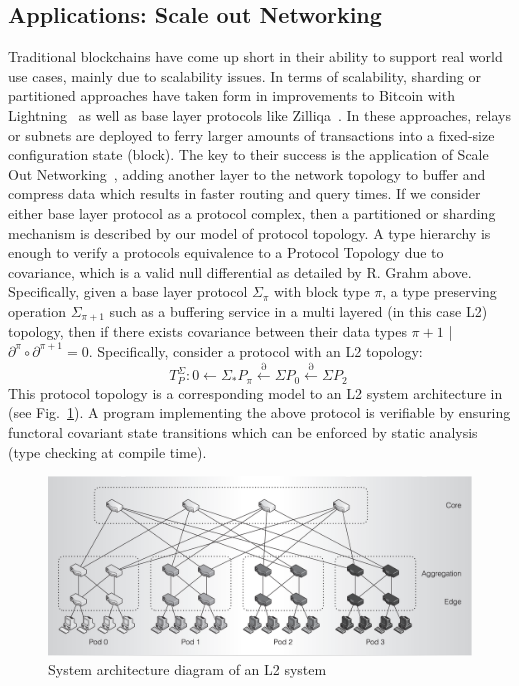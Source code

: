 \documentclass[runningheads]{llncs}
\begin{document}
\subsection{Applications: Scale out Networking}
Traditional blockchains have come up short in their ability to support real world use cases, mainly due to scalability issues. In terms of scalability, sharding or partitioned approaches have taken form in improvements to Bitcoin with Lightning~\cite{ref_url4} as well as base layer protocols like Zilliqa~\cite{ref_url5}. In these approaches, relays or subnets are deployed to ferry larger amounts of transactions into a fixed-size configuration state (block). The key to their success is the application of Scale Out Networking~\cite{ref_article11}, adding another layer to the network topology to buffer and compress data which results in faster routing and query times. If we consider either base layer protocol as a protocol complex, then a partitioned or sharding mechanism is described by our model of protocol topology. A type hierarchy is enough to verify a protocols equivalence to a Protocol Topology due to covariance, which is a valid null differential as detailed by R. Grahm above. Specifically, given a base layer protocol $\Sigma_\pi$ with block type $\pi$, a type preserving operation $\Sigma_{\pi+1}$ such as a buffering service in a multi layered (in this case L2) topology, then if there exists covariance between their data types $\pi+1$ | $\partial^\pi \circ \partial^{\pi+1} = 0$. Specifically, consider a protocol with an L2 topology:
\begin{equation}
T^{\Sigma}_P: 0 \leftarrow \Sigma_{*}P_\pi \xleftarrow{\partial} \Sigma P_{0} \xleftarrow{\partial} \Sigma P_2 \ 
\end{equation}
This protocol topology is a corresponding model to an L2 system architecture in (see Fig.~\ref{fig1}). A program implementing the above protocol is verifiable by ensuring functoral covariant state transitions which can be enforced by static analysis~\cite{ref_article10} (type checking at compile time).
\begin{figure}
\centering
\includegraphics[width=0.6\columnwidth]{l2-system-architecture.png}
\caption{System architecture diagram of an L2 system ~\cite{ref_article11}} \label{fig1}
\end{figure}
\end{document}
